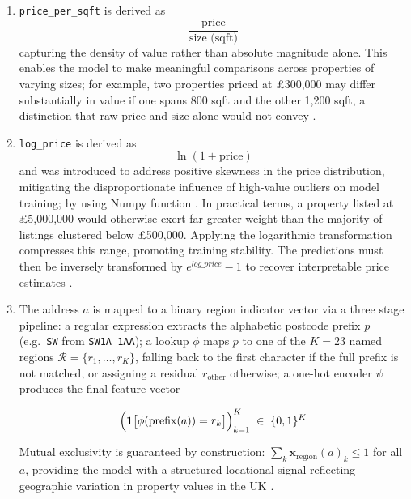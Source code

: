 \begin{enumerate}
    \item \texttt{price\_per\_sqft} is derived as 
    \begin{equation}
        \frac{\text{price}}{\text{size (sqft)}}
    \end{equation}
    capturing the density of value rather than absolute magnitude alone. This enables the model to make meaningful comparisons across properties of  varying sizes; for example, two properties priced at \pounds 300,000 may differ substantially in value if one spans 800 sqft and the other 1,200 sqft, a distinction that raw price and size alone would not convey \parencite{PermataHati2025}.

    \item \texttt{log\_price} is derived as 
    \begin{equation}
        \ln(1 + \text{price})
    \end{equation}
    and was introduced to address positive skewness in the price distribution, mitigating the disproportionate influence of high-value outliers on model training; by using Numpy function .
    In practical terms, a property listed at £5,000,000 would otherwise exert far greater weight than the majority of listings clustered below £500,000. Applying the logarithmic transformation compresses this range, promoting training stability. The predictions must then be inversely transformed by $e^{log\_price} - 1$ to recover interpretable price estimates \parencite{Veen2023} \parencite{Rico-Juan2021}.

    \item The address $a$ is mapped to a binary region indicator vector via a three stage pipeline: a regular expression extracts the alphabetic postcode prefix $p$ (e.g.\ \texttt{SW} from \texttt{SW1A 1AA}); a lookup $\phi$ maps $p$ to one of the $K = 23$ named regions $\mathcal{R} = \{r_1, \ldots, r_K\}$, falling back to the first character if the full prefix is not matched, or assigning a residual $r_{\text{other}}$ otherwise; a one-hot encoder $\psi$ produces the final feature vector

    \begin{equation}
        \Bigl(\mathbf{1}\bigl[\phi(\text{prefix}(a)) = r_k\bigr]\Bigr)_{k=1}^{K}
        \;\in\; \{0,1\}^{K}
    \end{equation}

    \noindent Mutual exclusivity is guaranteed by construction: $\sum_{k} \mathbf{x}_{\text{region}}(a)_k \leq 1$ for all $a$, providing the model with a structured locational signal reflecting geographic variation in property values in the UK \parencite{Kopczewska2022} \parencite{Rico-Juan2021}.
    
\end{enumerate}

